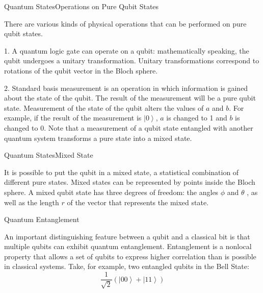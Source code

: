 \documentclass[UTF8,beamer,serif,ctexart]{beamer}
\begin{document}
\begin{frame}{Quantum States}{Operations on Pure Qubit States}
	\par There are various kinds of physical operations that can be performed on pure qubit states.
	\par 1. A quantum logic gate can operate on a qubit: mathematically speaking, the qubit undergoes a unitary transformation. Unitary transformations correspond to rotations of the qubit vector in the Bloch sphere.
	\par 2. Standard basis measurement is an operation in which information is gained about the state of the qubit. The result of the measurement will be a pure qubit state.  Measurement of the state of the qubit alters the values of $a$ and $b$. For example, if the result of the measurement is $\left|0\right\rangle$, $a$ is changed to 1 and $b$ is changed to 0. Note that a measurement of a qubit state entangled with another quantum system transforms a pure state into a mixed state.
\end{frame}

\begin{frame}{Quantum States}{Mixed State}
	\par It is possible to put the qubit in a mixed state, a statistical combination of different pure states. Mixed states can be represented by points inside the Bloch sphere. A mixed qubit state has three degrees of freedom: the angles $\phi$ and $\theta$ , as well as the length $r$ of the vector that represents the mixed state.
\end{frame}

\begin{frame}{Quantum Entanglement}{}
	\par An important distinguishing feature between a qubit and a classical bit is that multiple qubits can exhibit quantum entanglement. Entanglement is a nonlocal property that allows a set of qubits to express higher correlation than is possible in classical systems. Take, for example, two entangled qubits in the Bell State:
	\begin{equation}
		\dfrac{1}{\sqrt{2}}(\left|00\right\rangle+\left|11\right\rangle)
	\end {equation}	
\end{frame}
\end{document}
